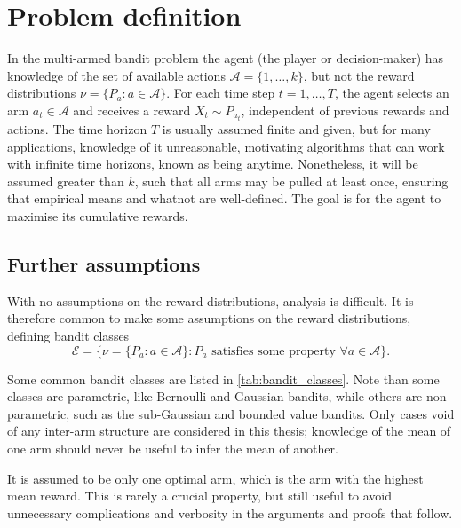 \section{Problem definition}
In the multi-armed bandit problem the agent (the player or decision-maker) has knowledge of the set of available actions $\mathcal{A}=\{1, \dots, k\}$, but not the reward distributions $\nu = \{P_a : a \in \mathcal{A}\}$.
For each time step $t=1, \dots, T$, the agent selects an arm $a_t \in \mathcal{A}$ and receives a reward $X_t \sim P_{a_t}$, independent of previous rewards and actions.
The time horizon $T$ is usually assumed finite and given, but for many applications, knowledge of it unreasonable, motivating algorithms that can work with infinite time horizons, known as being anytime.
Nonetheless, it will be assumed greater than $k$, such that all arms may be pulled at least once, ensuring that empirical means and whatnot are well-defined.
The goal is for the agent to maximise its cumulative rewards.

\subsection{Further assumptions}
With no assumptions on the reward distributions, analysis is difficult.
It is therefore common to make some assumptions on the reward distributions, defining bandit classes
\begin{equation}
    \mathcal{E} = \{\nu = \{P_a : a \in \mathcal{A}\} : P_a \text{ satisfies some property } \forall a \in \mathcal{A}\}.
\end{equation}

Some common bandit classes are listed in \cref{tab:bandit_classes}.
Note than some classes are parametric, like Bernoulli and Gaussian bandits, while others are non-parametric, such as the sub-Gaussian and bounded value bandits.
Only cases void of any inter-arm structure are considered in this thesis; knowledge of the mean of one arm should never be useful to infer the mean of another.

It is assumed to be only one optimal arm, which is the arm with the highest mean reward.
This is rarely a crucial property, but still useful to avoid unnecessary complications and verbosity in the arguments and proofs that follow.


